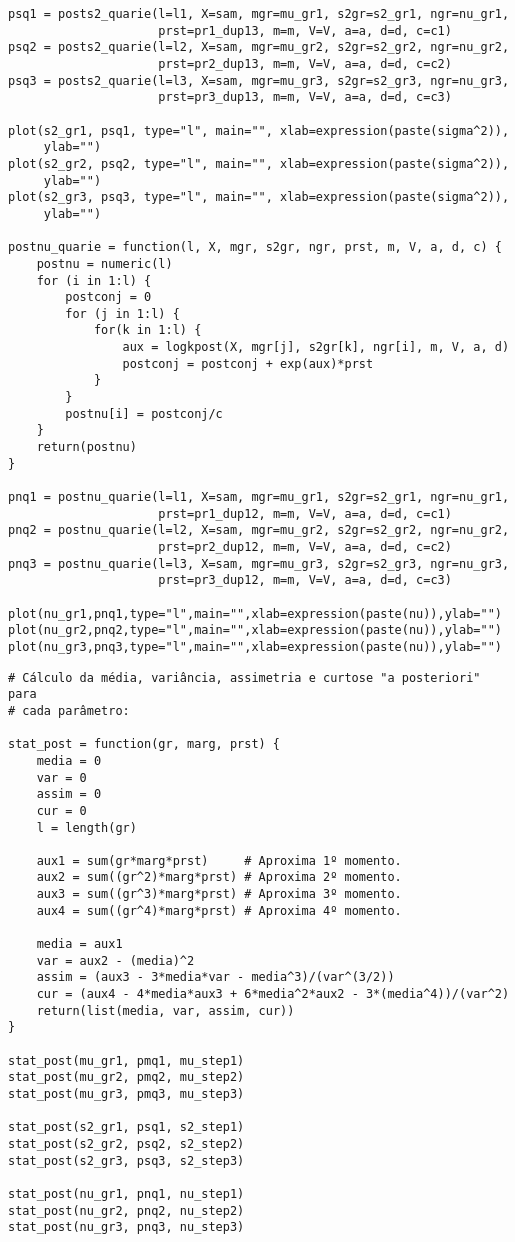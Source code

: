 \documentclass[12pt,reqno,a4paper,oneside]{article}
\begin{document}
\begin{verbatim}
psq1 = posts2_quarie(l=l1, X=sam, mgr=mu_gr1, s2gr=s2_gr1, ngr=nu_gr1,
					 prst=pr1_dup13, m=m, V=V, a=a, d=d, c=c1)
psq2 = posts2_quarie(l=l2, X=sam, mgr=mu_gr2, s2gr=s2_gr2, ngr=nu_gr2,
					 prst=pr2_dup13, m=m, V=V, a=a, d=d, c=c2)
psq3 = posts2_quarie(l=l3, X=sam, mgr=mu_gr3, s2gr=s2_gr3, ngr=nu_gr3,
					 prst=pr3_dup13, m=m, V=V, a=a, d=d, c=c3)

plot(s2_gr1, psq1, type="l", main="", xlab=expression(paste(sigma^2)),
	 ylab="")
plot(s2_gr2, psq2, type="l", main="", xlab=expression(paste(sigma^2)),
	 ylab="")
plot(s2_gr3, psq3, type="l", main="", xlab=expression(paste(sigma^2)), 
	 ylab="")

postnu_quarie = function(l, X, mgr, s2gr, ngr, prst, m, V, a, d, c) {
	postnu = numeric(l)
	for (i in 1:l) {
		postconj = 0
		for (j in 1:l) {
			for(k in 1:l) {
				aux = logkpost(X, mgr[j], s2gr[k], ngr[i], m, V, a, d)
				postconj = postconj + exp(aux)*prst
			}
		}
		postnu[i] = postconj/c
	}
	return(postnu)
}

pnq1 = postnu_quarie(l=l1, X=sam, mgr=mu_gr1, s2gr=s2_gr1, ngr=nu_gr1,
					 prst=pr1_dup12, m=m, V=V, a=a, d=d, c=c1)
pnq2 = postnu_quarie(l=l2, X=sam, mgr=mu_gr2, s2gr=s2_gr2, ngr=nu_gr2,
					 prst=pr2_dup12, m=m, V=V, a=a, d=d, c=c2)
pnq3 = postnu_quarie(l=l3, X=sam, mgr=mu_gr3, s2gr=s2_gr3, ngr=nu_gr3,
					 prst=pr3_dup12, m=m, V=V, a=a, d=d, c=c3)

plot(nu_gr1,pnq1,type="l",main="",xlab=expression(paste(nu)),ylab="")
plot(nu_gr2,pnq2,type="l",main="",xlab=expression(paste(nu)),ylab="")
plot(nu_gr3,pnq3,type="l",main="",xlab=expression(paste(nu)),ylab="")
\end{verbatim}

\newpage

\begin{verbatim}
# Cálculo da média, variância, assimetria e curtose "a posteriori" para
# cada parâmetro:

stat_post = function(gr, marg, prst) {
	media = 0
	var = 0
	assim = 0
	cur = 0
	l = length(gr)
	
	aux1 = sum(gr*marg*prst)     # Aproxima 1º momento.
	aux2 = sum((gr^2)*marg*prst) # Aproxima 2º momento.
	aux3 = sum((gr^3)*marg*prst) # Aproxima 3º momento.
	aux4 = sum((gr^4)*marg*prst) # Aproxima 4º momento.
	
	media = aux1
	var = aux2 - (media)^2
	assim = (aux3 - 3*media*var - media^3)/(var^(3/2))
	cur = (aux4 - 4*media*aux3 + 6*media^2*aux2 - 3*(media^4))/(var^2)
	return(list(media, var, assim, cur))
}

stat_post(mu_gr1, pmq1, mu_step1)
stat_post(mu_gr2, pmq2, mu_step2)
stat_post(mu_gr3, pmq3, mu_step3)

stat_post(s2_gr1, psq1, s2_step1)
stat_post(s2_gr2, psq2, s2_step2)
stat_post(s2_gr3, psq3, s2_step3)

stat_post(nu_gr1, pnq1, nu_step1)
stat_post(nu_gr2, pnq2, nu_step2)
stat_post(nu_gr3, pnq3, nu_step3)

\end{verbatim}
\end{document}
